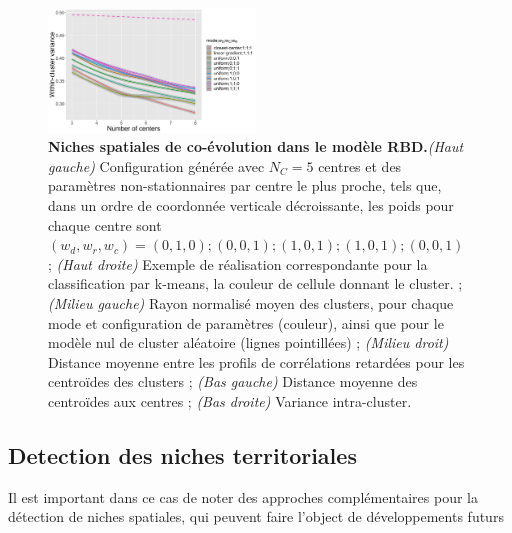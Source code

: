 \documentclass[11pt]{article}
\begin{document}
\begin{figure}
	\includegraphics[width=0.49\textwidth]{figures/withinss.png}
	\caption{\textbf{Niches spatiales de co-évolution dans le modèle RBD.}\textit{(Haut gauche)} Configuration générée avec $N_C = 5$ centres et des paramètres non-stationnaires par centre le plus proche, tels que, dans un ordre de coordonnée verticale décroissante, les poids pour chaque centre sont $(w_d,w_r,w_c) = (0,1,0) ; (0,0,1) ; (1,0,1) ; (1,0,1) ; (0,0,1)$ ; \textit{(Haut droite)} Exemple de réalisation correspondante pour la classification par k-means, la couleur de cellule donnant le cluster. ; \textit{(Milieu gauche)} Rayon normalisé moyen des clusters, pour chaque mode et configuration de paramètres (couleur), ainsi que pour le modèle nul de cluster aléatoire (lignes pointillées) ; \textit{(Milieu droit)} Distance moyenne entre les profils de corrélations retardées pour les centroïdes des clusters ; \textit{(Bas gauche)} Distance moyenne des centroïdes aux centres ; \textit{(Bas droite)} Variance intra-cluster.}
\end{figure}



\subsection{Detection des niches territoriales}

Il est important dans ce cas de noter des approches complémentaires pour la détection de niches spatiales, qui peuvent faire l'object de développements futurs


\end{document}
